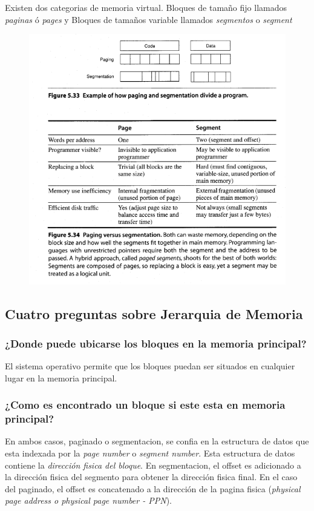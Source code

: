 \documentclass{article}
\begin{document}
Existen dos categorias de memoria virtual. Bloques de tamaño fijo llamados \textit{paginas} ó \textit{pages} y Bloques de tamaños variable llamados \textit{segmentos} o \textit{segment}

\begin{figure}[h!]
    \includegraphics[width=\linewidth]{imagenes/PaginasVsSementos.png}
\end{figure}

\newpage
\subsection{Cuatro preguntas sobre Jerarquia de Memoria}
\subsubsection{¿Donde puede ubicarse los bloques en la memoria principal?}

El sistema operativo permite que los bloques puedan ser situados en cualquier lugar en la memoria principal.

\subsubsection{¿Como es encontrado un bloque si este esta en memoria principal?}

En ambos casos, paginado o segmentacion, se confia en la estructura de datos que esta indexada por la \textit{page number} o \textit{segment number}. Esta estructura de datos contiene la \textit{dirección fisica del bloque}.
En segmentacion, el offset es adicionado a la dirección fisica del segmento para obtener la dirección fisica final. En el caso del paginado, el offset es concatenado a la dirección de la pagina fisica (\textit{physical page address o physical page number - PPN}).
\end{document}
